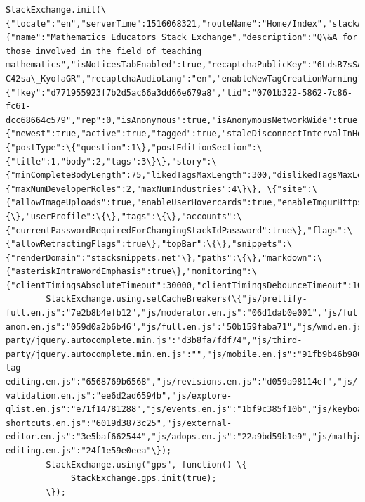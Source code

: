 \documentclass[11pt]{article}
\begin{document}
\begin{Verbatim}[commandchars=\\\{\}]
        StackExchange.init(\{"locale":"en","serverTime":1516068321,"routeName":"Home/Index","stackAuthUrl":"https://stackauth.com","networkMetaHostname":"meta.stackexchange.com","site":\{"name":"Mathematics Educators Stack Exchange","description":"Q\&A for those involved in the field of teaching mathematics","isNoticesTabEnabled":true,"recaptchaPublicKey":"6LdsB7sSAAAAAAzjgEF\_Hd8vXv-C42sa\_KyofaGR","recaptchaAudioLang":"en","enableNewTagCreationWarning":false,"insertSpaceAfterNameTabCompletion":false,"id":548,"childUrl":"https://matheducators.meta.stackexchange.com","enableSocialMediaInSharePopup":true,"protocol":"https"\},"user":\{"fkey":"d771955923f7b2d5ac66a3dd66e679a8","tid":"0701b322-5862-7c86-fc61-dcc68664c579","rep":0,"isAnonymous":true,"isAnonymousNetworkWide":true,"canSeeNewHeaderDesign":true\},"realtime":\{"newest":true,"active":true,"tagged":true,"staleDisconnectIntervalInHours":0,"workerIframeDomain":"https://cdn.sstatic.net"\},"events":\{"postType":\{"question":1\},"postEditionSection":\{"title":1,"body":2,"tags":3\}\},"story":\{"minCompleteBodyLength":75,"likedTagsMaxLength":300,"dislikedTagsMaxLength":300\},"jobPreferences":\{"maxNumDeveloperRoles":2,"maxNumIndustries":4\}\}, \{"site":\{"allowImageUploads":true,"enableUserHovercards":true,"enableImgurHttps":true,"forceHttpsImages":true\},"comments":\{\},"userProfile":\{\},"tags":\{\},"accounts":\{"currentPasswordRequiredForChangingStackIdPassword":true\},"flags":\{"allowRetractingFlags":true\},"topBar":\{\},"snippets":\{"renderDomain":"stacksnippets.net"\},"paths":\{\},"markdown":\{"asteriskIntraWordEmphasis":true\},"monitoring":\{"clientTimingsAbsoluteTimeout":30000,"clientTimingsDebounceTimeout":1000\}\});
        StackExchange.using.setCacheBreakers(\{"js/prettify-full.en.js":"7e2b8b4efb12","js/moderator.en.js":"06d1dab0e001","js/full-anon.en.js":"059d0a2b6b46","js/full.en.js":"50b159faba71","js/wmd.en.js":"2d1624a29c03","js/third-party/jquery.autocomplete.min.js":"d3b8fa7fdf74","js/third-party/jquery.autocomplete.min.en.js":"","js/mobile.en.js":"91fb9b46b986","js/help.en.js":"a9d821110060","js/tageditor.en.js":"4f83add90c55","js/tageditornew.en.js":"f96d3bb8fe70","js/inline-tag-editing.en.js":"6568769b6568","js/revisions.en.js":"d059a98114ef","js/review.en.js":"bf50f86e4b67","js/tagsuggestions.en.js":"d1ff9b84abe5","js/post-validation.en.js":"ee6d2ad6594b","js/explore-qlist.en.js":"e71f14781288","js/events.en.js":"1bf9c385f10b","js/keyboard-shortcuts.en.js":"6019d3873c25","js/external-editor.en.js":"3e5baf662544","js/adops.en.js":"22a9bd59b1e9","js/mathjax-editing.en.js":"24f1e59e0eea"\});
        StackExchange.using("gps", function() \{
             StackExchange.gps.init(true);
        \});
    

\end{Verbatim}
\end{document}
